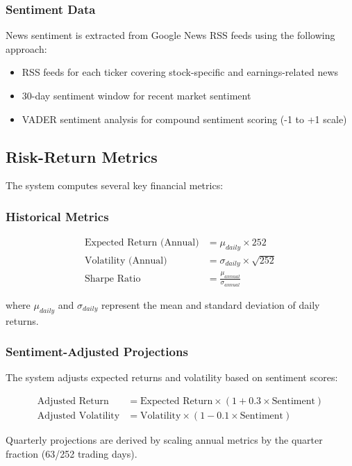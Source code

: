 \documentclass[12pt,a4paper]{article}
\begin{document}
\subsubsection{Sentiment Data}
News sentiment is extracted from Google News RSS feeds using the following approach:
\begin{itemize}
\item RSS feeds for each ticker covering stock-specific and earnings-related news
\item 30-day sentiment window for recent market sentiment
\item VADER sentiment analysis for compound sentiment scoring (-1 to +1 scale)
\end{itemize}

\subsection{Risk-Return Metrics}

The system computes several key financial metrics:

\subsubsection{Historical Metrics}
\begin{align}
\text{Expected Return (Annual)} &= \mu_{daily} \times 252 \\
\text{Volatility (Annual)} &= \sigma_{daily} \times \sqrt{252} \\
\text{Sharpe Ratio} &= \frac{\mu_{annual}}{\sigma_{annual}}
\end{align}

where $\mu_{daily}$ and $\sigma_{daily}$ represent the mean and standard deviation of daily returns.

\subsubsection{Sentiment-Adjusted Projections}
The system adjusts expected returns and volatility based on sentiment scores:

\begin{align}
\text{Adjusted Return} &= \text{Expected Return} \times (1 + 0.3 \times \text{Sentiment}) \\
\text{Adjusted Volatility} &= \text{Volatility} \times (1 - 0.1 \times \text{Sentiment})
\end{align}

Quarterly projections are derived by scaling annual metrics by the quarter fraction (63/252 trading days).
\end{document}
